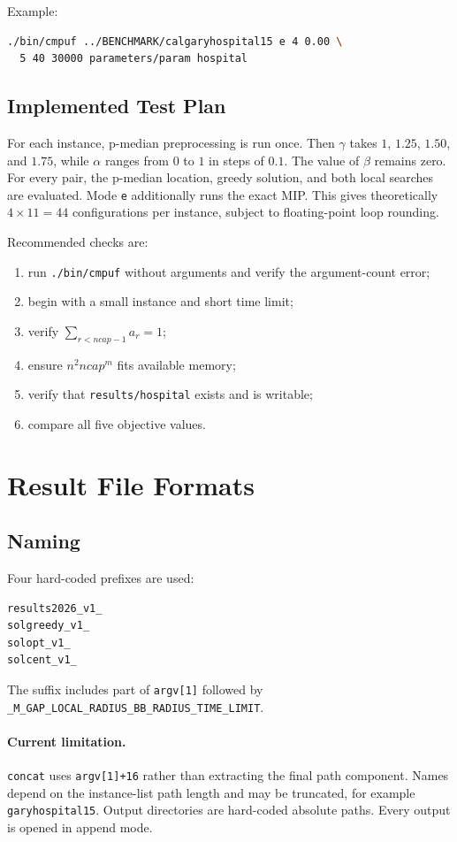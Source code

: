 \documentclass[11pt,a4paper]{article}
\newcommand{\code}[1]{\texttt{#1}}
\begin{document}
Example:
\begin{lstlisting}[language=bash]
./bin/cmpuf ../BENCHMARK/calgaryhospital15 e 4 0.00 \
  5 40 30000 parameters/param hospital
\end{lstlisting}

\subsection{Implemented Test Plan}

For each instance, p-median preprocessing is run once. Then $\gamma$ takes
$1$, $1.25$, $1.50$, and $1.75$, while $\alpha$ ranges from $0$ to $1$ in
steps of $0.1$. The value of $\beta$ remains zero. For every pair, the
p-median location, greedy solution, and both local searches are evaluated.
Mode \code{e} additionally runs the exact MIP. This gives theoretically
$4\times11=44$ configurations per instance, subject to floating-point loop
rounding.

Recommended checks are:
\begin{enumerate}
\item run \code{./bin/cmpuf} without arguments and verify the argument-count
error;
\item begin with a small instance and short time limit;
\item verify $\sum_{r<ncap-1}a_r=1$;
\item ensure $n^2ncap^m$ fits available memory;
\item verify that \code{results/hospital} exists and is writable;
\item compare all five objective values.
\end{enumerate}

\section{Result File Formats}

\subsection{Naming}

Four hard-coded prefixes are used:
\begin{lstlisting}
results2026_v1_
solgreedy_v1_
solopt_v1_
solcent_v1_
\end{lstlisting}
The suffix includes part of \code{argv[1]} followed by
\code{\_M\_GAP\_LOCAL\_RADIUS\_BB\_RADIUS\_TIME\_LIMIT}.

\paragraph{Current limitation.}
\code{concat} uses \code{argv[1]+16} rather than extracting the final path
component. Names depend on the instance-list path length and may be truncated,
for example \code{garyhospital15}. Output directories are hard-coded absolute
paths. Every output is opened in append mode.
\end{document}
